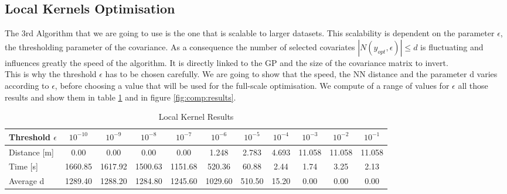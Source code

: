 \subsection{Local Kernels Optimisation}

The 3rd Algorithm that we are going to use is the one that is scalable to larger datasets. This scalability is dependent on the parameter $\epsilon$, the thresholding parameter of the covariance. As a consequence the number of selected covariates  $|N(y_{opt},\epsilon)| \leq d $ is fluctuating and influences greatly the speed of the algorithm. It is directly linked to the GP and the size of the covariance matrix to invert.  \\ 

This is why the threshold $\epsilon$ has to be chosen carefully. We are going to show that the speed, the NN distance and the parameter d varies according to $\epsilon$, before choosing a value that will be used for the full-scale optimisation. We compute of a range of values for $\epsilon$ all those results and show them in table \ref{tab:comp:results} and in figure \ref{fig:comp:results}. \\



\begin{table}[h!]
\centering
\scriptsize
\begin{tabular}{|l|c|c|c|c|c|c|c|c|c|c|}
  \hline
  Threshold $\epsilon$ & $10^{-10} $ &  $10^{-9}$ & $10^{-8}$ & $10^{-7}$ & $10^{-6}$ & $10^{-5}$ & $10^{-4}$ & $10^{-3}$ & $10^{-2}$ & $10^{-1}$ \\
    \hline
  Distance [m]       &    0.00 &    0.00 &    0.00 &    0.00 &   1.248 &  2.783 & 4.693 & 11.058 & 11.058 & 11.058 \\
Time [s]       & 1660.85 & 1617.92 & 1500.63 & 1151.68 &  520.36 &  60.88 &  2.44 &   1.74 &   3.25 &   2.13 \\
Average d & 1289.40 & 1288.20 & 1284.80 & 1245.60 & 1029.60 & 510.50 & 15.20 &   0.00 &   0.00 &   0.00 \\
  \hline
\end{tabular}
\caption{Local Kernel Results}
\label{tab:comp:results}
\end{table}

